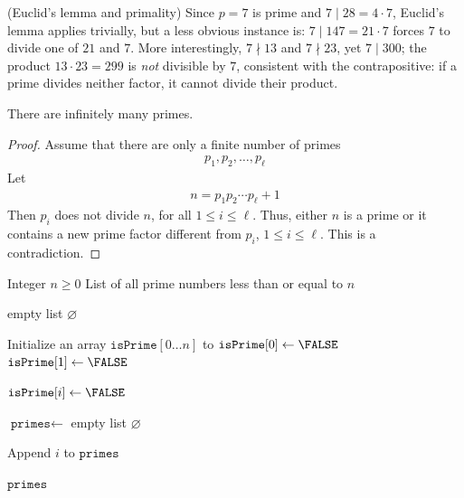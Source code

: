 \documentclass[a4paper, 12pt]{book} %
\begin{document}
\begin{example}
    (Euclid's lemma and primality) Since $p = 7$ is prime and $7 \mid 28 = 4 \cdot 7$, Euclid's lemma applies trivially, but a less obvious instance is: $7 \mid 147 = 21 \cdot 7$ forces $7$ to divide one of $21$ and $7$. More interestingly, $7 \nmid 13$ and $7 \nmid 23$, yet $7 \mid 300$; the product $13 \cdot 23 = 299$ is \emph{not} divisible by $7$, consistent with the contrapositive: if a prime divides neither factor, it cannot divide their product.
\end{example}

\begin{theorem}
    There are infinitely many primes.
\end{theorem}
\begin{proof}
    Assume that there are only a finite number of primes 
    \begin{align}
        p_1, p_2, \ldots, p_\ell
    \end{align}
    Let
    \begin{align}
        n = p_1 p_2 \cdots p_\ell + 1
    \end{align}
    Then $p_i$ does not divide $n$, for all $1 \leq i \leq \ell$. Thus, either $n$ is a prime or it contains a new prime factor diﬀerent from $p_i$, $1 \leq i \leq \ell$. This is a contradiction.
\end{proof}


\begin{algorithm}[H]
\caption{Sieve of Eratosthenes}
\label{alg:sieve}
\begin{algorithmic}[1]

\REQUIRE Integer $n \geq 0$
\ENSURE List of all prime numbers less than or equal to $n$

    \RETURN empty list $\varnothing$
\ENDIF

\STATE Initialize an array $\texttt{isPrime}[0\ldots n]$ to \TRUE
\STATE $\texttt{isPrime}[0] \gets \FALSE$
\STATE $\texttt{isPrime}[1] \gets \FALSE$

            \STATE $\texttt{isPrime}[i] \gets \FALSE$
        \ENDFOR
    \ENDIF
\ENDFOR

\STATE $\texttt{primes} \gets$ empty list $\varnothing$

        \STATE Append $i$ to $\texttt{primes}$
    \ENDIF
\ENDFOR

\RETURN $\texttt{primes}$

\end{algorithmic}
\end{algorithm}
\end{document}
